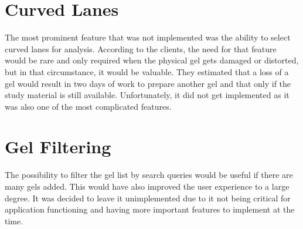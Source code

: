\section{Curved Lanes}
The most prominent feature that was not implemented was the ability to select curved lanes for analysis. According to the clients, the need for that feature would be rare and only required when the physical gel gets damaged or distorted, but in that circumstance, it would be valuable. They estimated that a loss of a gel would result in two days of work to prepare another gel and that only if the study material is still available. Unfortunately, it did not get implemented as it was also one of the most complicated features.

\section{Gel Filtering}
The possibility to filter the gel list by search queries would be useful if there are many gels added. This would have also improved the user experience to a large degree. It was decided to leave it unimplemented due to it not being critical for application functioning and having more important features to implement at the time.
